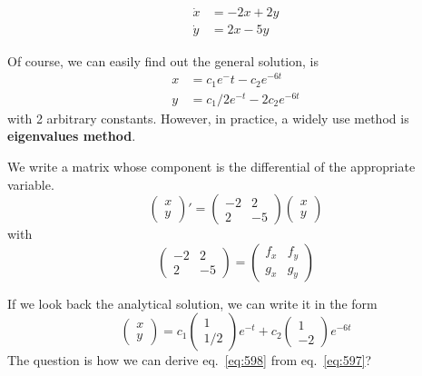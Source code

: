 \begin{equation}
  \label{eq:595}
  \begin{split}
    \dot{x} &= -2x + 2y \\
    \dot{y} &= 2x - 5y
  \end{split}
\end{equation}

Of course, we can easily find out the general solution, is
\begin{equation}
  \label{eq:596}
  \begin{split}
    x &= c_1e^-t - c_2 e^{-6t} \\
    y &= c_1/2e^{-t} - 2c_2 e^{-6t}
  \end{split}
\end{equation}
with 2 arbitrary constants. However, in practice, a widely use method
is {\bf eigenvalues method}. 

We write a matrix whose component is the differential of the
appropriate variable.
\begin{equation}
  \label{eq:597}
  \left(
    \begin{array}{c}
      x \\ y
    \end{array}
  \right)' =   \left(
    \begin{array}{cc}
      -2  & 2 \\ 2 & -5
    \end{array}
  \right)    \left(
    \begin{array}{c}
      x \\ y
    \end{array}
  \right)
\end{equation}
with 
\begin{equation*}
  \left(
    \begin{array}{cc}
      -2  & 2 \\ 2 & -5
    \end{array}
  \right)   = \left(
    \begin{array}{cc}
      f_x  & f_y \\ g_x & g_y
    \end{array}
  \right)   
\end{equation*}

If we look back the analytical solution, we can write it in the form
\begin{equation}
  \label{eq:598}
  \left(
    \begin{array}{c}
      x \\ y
    \end{array}
  \right) = c_1  \left(
    \begin{array}{c}
      1 \\ 1/2
    \end{array}
  \right) e^{-t} + c_2  \left(
    \begin{array}{c}
      1 \\ -2
    \end{array}
  \right) e^{-6t}
\end{equation}
The question is how we can derive eq.~\eqref{eq:598} from
eq.~\eqref{eq:597}?

